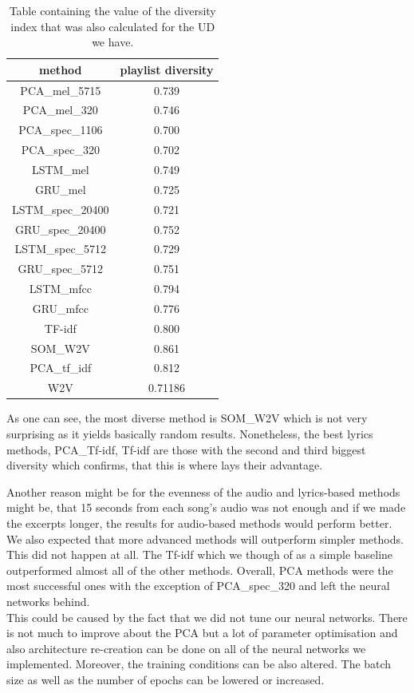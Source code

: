 \begin{table}[h]
\centering

\begin{tabu} to 1.7\textwidth {| c | c |}
\hline
\textbf{method} & \textbf{playlist diversity} \\
\hline
PCA\_mel\_5715 & 0.739 \\
\hline
PCA\_mel\_320 & 0.746 \\
\hline
PCA\_spec\_1106 & 0.700 \\
\hline
PCA\_spec\_320 & 0.702 \\
\hline
LSTM\_mel & 0.749 \\
\hline
GRU\_mel & 0.725 \\
\hline
LSTM\_spec\_20400 & 0.721 \\
\hline
GRU\_spec\_20400 &  0.752\\
\hline
LSTM\_spec\_5712 & 0.729 \\
\hline
GRU\_spec\_5712 &  0.751 \\
\hline
LSTM\_mfcc & 0.794 \\
\hline
GRU\_mfcc & 0.776 \\
\hline
TF-idf & 0.800 \\
\hline
SOM\_W2V & 0.861 \\
\hline
PCA\_tf\_idf & 0.812 \\
\hline
W2V & 0.71186 \\
\hline
\end{tabu} 
\caption{Table containing the value of the diversity index that was also calculated for the UD we have.}
\label{table:diversity_table}
\end{table}
As one can see, the most diverse method is SOM\_W2V which is not very surprising as it yields basically random results. Nonetheless, the best lyrics methods, PCA\_Tf-idf, Tf-idf are those with the second and third biggest diversity which confirms, that this is where lays their advantage.

Another reason might be for the evenness of the audio and lyrics-based methods might be, that 15 seconds from each song's audio was not enough and if we made the excerpts longer, the results for audio-based methods would perform better. \\

We also expected that more advanced methods will outperform simpler methods. This did not happen at all. The Tf-idf which we though of as a simple baseline outperformed almost all of the other methods. Overall, PCA methods were the most successful ones with the exception of PCA\_spec\_320 and left the neural networks behind. \\
This could be caused by the fact that we did not tune our neural networks. There is not much to improve about the PCA but a lot of parameter optimisation and also architecture re-creation can be done on all of the neural networks we implemented. Moreover, the training conditions can be also altered. The batch size as well as the number of epochs can be lowered or increased. \\

